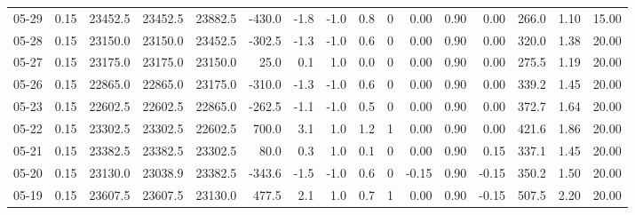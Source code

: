 \begin{threeparttable}
{\begin{tabular}{lrrrrrrrrrrrrrrr}
  05-29 &     0.15 & 23452.5 & 23452.5 & 23882.5 &     -430.0 &           -1.8 &                     -1.0 &                 0.8 &              0 &       0.00 &      0.90 &           0.00 &            266.0 &            1.10 &                  15.00 \\
  05-28 &     0.15 & 23150.0 & 23150.0 & 23452.5 &     -302.5 &           -1.3 &                     -1.0 &                 0.6 &              0 &       0.00 &      0.90 &           0.00 &            320.0 &            1.38 &                  20.00 \\
  05-27 &     0.15 & 23175.0 & 23175.0 & 23150.0 &       25.0 &            0.1 &                      1.0 &                 0.0 &              0 &       0.00 &      0.90 &           0.00 &            275.5 &            1.19 &                  20.00 \\
  05-26 &     0.15 & 22865.0 & 22865.0 & 23175.0 &     -310.0 &           -1.3 &                     -1.0 &                 0.6 &              0 &       0.00 &      0.90 &           0.00 &            339.2 &            1.45 &                  20.00 \\
  05-23 &     0.15 & 22602.5 & 22602.5 & 22865.0 &     -262.5 &           -1.1 &                     -1.0 &                 0.5 &              0 &       0.00 &      0.90 &           0.00 &            372.7 &            1.64 &                  20.00 \\
  05-22 &     0.15 & 23302.5 & 23302.5 & 22602.5 &      700.0 &            3.1 &                      1.0 &                 1.2 &              1 &       0.00 &      0.90 &           0.00 &            421.6 &            1.86 &                  20.00 \\
  05-21 &     0.15 & 23382.5 & 23382.5 & 23302.5 &       80.0 &            0.3 &                      1.0 &                 0.1 &              0 &       0.00 &      0.90 &           0.15 &            337.1 &            1.45 &                  20.00 \\
  05-20 &     0.15 & 23130.0 & 23038.9 & 23382.5 &     -343.6 &           -1.5 &                     -1.0 &                 0.6 &              0 &      -0.15 &      0.90 &          -0.15 &            350.2 &            1.50 &                  20.00 \\
  05-19 &     0.15 & 23607.5 & 23607.5 & 23130.0 &      477.5 &            2.1 &                      1.0 &                 0.7 &              1 &       0.00 &      0.90 &          -0.15 &            507.5 &            2.20 &                  20.00 \\

\end{tabular}}
\end{threeparttable}
